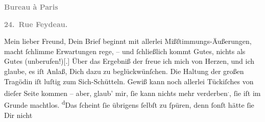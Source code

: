 \pstart
           \begin{otherlanguage}{french}\textcolor{gray}{\textbf{\textbf{Bureau à Paris}}}\end{otherlanguage}\pend
           
\pstart
           \begin{otherlanguage}{french}\textcolor{gray}{\textbf{\textbf{24. Rue Feydeau.}}}\end{otherlanguage}\pend
           
\pstart\center{}Mein lieber Freund,\pend\vspace{0.5em}
\pstart
           Dein Brief beginnt mit allerlei Mißſtimmungs-Äußerungen, macht ſchlimme Erwartungen
               rege, – und ſchließlich kommt  Gutes, nichts als
               Gutes (unberufen!){[}.{]} Über das Ergebniß der \label{K_L02748-1v}\label{K_L02748-1} freue ich mich von Herzen, und ich glaube, es iſt Anlaß, Dich dazu zu
               beglückwünſchen. Die Haltung der großen Tragödin iſt luſtig zum Sich-Schütteln. Gewiß kann noch
               allerlei Tückiſches von dieſer Seite kommen – {\pb}aber,
               glaub’ mir, ſie kann nichts
               mehr verderben\substVorne{}\textsuperscript{.}\substDazwischen{},\substHinten{} ſie iſt im Grunde machtlos. \substVorne{}\textsuperscript{d}\substDazwischen{}D\substHinten{}as ſcheint ſie übrigens ſelbſt zu ſpüren, denn ſonſt hätte ſie Dir nicht
